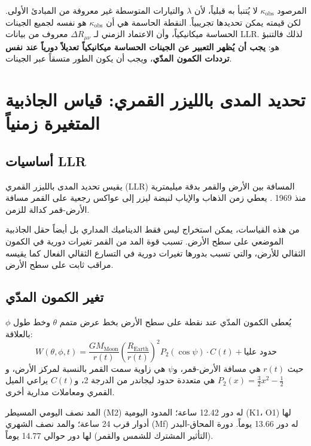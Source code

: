\documentclass[11pt,a4paper]{article}
\theoremstyle{remark}
\begin{document}
	المرصود \(\kappa_{\text{obs}}\) لا يُتنبأ به قبلياً، لأن \(\lambda\) والتيارات المتوسطة غير معروفة من المبادئ الأولى. لكن قيمته يمكن تحديدها تجريبياً. النقطة الحاسمة هي أن \(\kappa_{\text{obs}}\) هو نفسه لجميع الجينات الحساسة ميكانيكياً، وأن الاعتماد الزمني لـ \(\Delta R_{\mu\nu}\) معروف من بيانات LLR. لذلك فالتنبؤ هو: \textbf{يجب أن يُظهر التعبير عن الجينات الحساسة ميكانيكياً تعديلاً دورياً عند نفس ترددات الكمون المدّي}، ويجب أن يكون الطور متسقاً عبر الجينات.
	
	\section{تحديد المدى بالليزر القمري: قياس الجاذبية المتغيرة زمنياً}
	\label{sec:llr}
	
	\subsection{أساسيات LLR}
	
	يقيس تحديد المدى بالليزر القمري (LLR) المسافة بين الأرض والقمر بدقة ميليمترية منذ 1969 \cite{LLR-IfE}. يعطي زمن الذهاب والإياب لنبضة ليزر إلى عواكس رجعية على القمر مسافة الأرض-قمر كدالة للزمن.
	
	من هذه القياسات، يمكن استخراج ليس فقط الديناميك المداري بل أيضاً حقل الجاذبية الموضعي على سطح الأرض. تسبب قوة المد من القمر تغيرات دورية في الكمون الثقالي للأرض، والتي تسبب بدورها تغيرات دورية في التسارع الثقالي الفعال كما يقيسه مراقب ثابت على سطح الأرض.
	
	\subsection{تغير الكمون المدّي}
	
	يُعطى الكمون المدّي عند نقطة على سطح الأرض بخط عرض متمم \(\theta\) وخط طول \(\phi\) بالعلاقة:
	\begin{equation}
		W(\theta,\phi,t) = \frac{GM_{\text{Moon}}}{r(t)} \left(\frac{R_{\text{Earth}}}{r(t)}\right)^2 P_2(\cos\psi) \cdot C(t) + \text{حدود عليا}
		\label{eq:tidal-full}
	\end{equation}
	حيث \(r(t)\) هي مسافة الأرض-قمر، و\(\psi\) هي زاوية سمت القمر بالنسبة لمركز الأرض، و\(P_2(x)=\frac{3}{2}x^2-\frac12\) هي متعددة حدود ليجاندر من الدرجة 2، و\(C(t)\) يراعي الميل القمري ومعاملات مدارية أخرى.
	
	المد نصف اليومي المسيطر (M2) له دور 12.42 ساعة؛ المدود اليومية (K1، O1) لها أدوار قرب 24 ساعة؛ والمد نصف الشهري (Mf) له دور 13.66 يوماً. دورة المحاق-البدر (التأثير المشترك للشمس والقمر) لها دور حوالي 14.77 يوماً.
	
\end{document}
